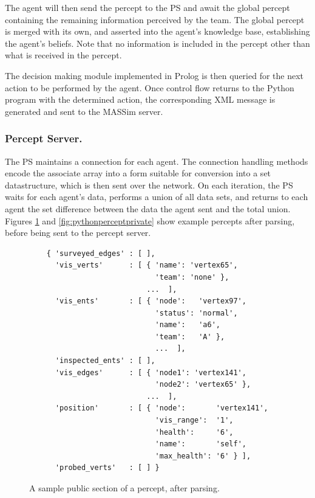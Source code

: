     The agent will then send the percept to the PS and await the global percept
    containing the remaining information perceived by the team. The global
    percept is merged with its own, and asserted into the agent's knowledge
    base, establishing the agent's beliefs.  Note that no information is
    included in the percept other than what is received in the percept.

    The decision making module implemented in Prolog is then queried for the
    next action to be performed by the agent.  Once control flow returns to the
    Python program with the determined action, the corresponding XML message is
    generated and sent to the MASSim server. 

\subsubsection{Percept Server.}
    The PS maintains a connection for each agent.  The connection handling
    methods encode the associate array into a form suitable for conversion into
    a set datastructure, which is then sent over the network.  On each
    iteration, the PS waits for each agent's data, performs a union of all data
    sets, and returns to each agent the set difference between the data the
    agent sent and the total union.  Figures \ref{fig:pythonperceptpublic} and
    \ref{fig:pythonperceptprivate} show example percepts after parsing, before
    being sent to the percept server.

    \begin{figure}
    \centering
    \label{fig:pythonperceptpublic}
    \begin{small}
    \begin{verbatim}
    { 'surveyed_edges' : [ ], 
      'vis_verts'      : [ { 'name': 'vertex65',  
                             'team': 'none' }, 
                           ...  ],  
      'vis_ents'       : [ { 'node':   'vertex97',  
                             'status': 'normal', 
                             'name':   'a6',  
                             'team':   'A' }, 
                             ...  ],  
      'inspected_ents' : [ ],  
      'vis_edges'      : [ { 'node1': 'vertex141', 
                             'node2': 'vertex65' }, 
                           ...  ], 
      'position'       : [ { 'node':       'vertex141', 
                             'vis_range':  '1', 
                             'health':     '6', 
                             'name':       'self', 
                             'max_health': '6' } ], 
      'probed_verts'   : [ ] }
    \end{verbatim}
    \end{small}
    \caption{A sample public section of a percept, after parsing.}
    \end{figure}

